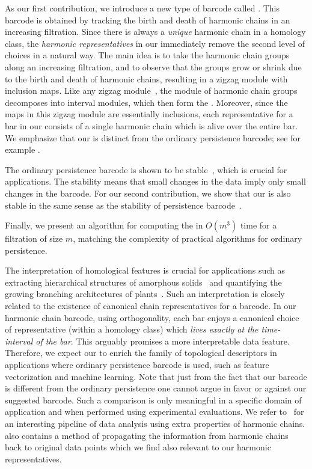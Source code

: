 As our first contribution, we introduce a new type of barcode called  \emph{\hcb}. This barcode is obtained by tracking the birth and death of harmonic chains in an increasing filtration.  
Since there is always a \emph{unique} harmonic chain in a homology class, the \emph{harmonic representatives} in our {\hcb} immediately remove the second level of choices in a natural way. The main idea is to take the harmonic chain groups along an increasing filtration, and to observe that the groups grow or shrink due to the birth and death of harmonic chains, resulting in a zigzag module with inclusion maps. 
Like any zigzag module~\cite{CarlssonSilva2010}, the module of harmonic chain groups decomposes into interval modules, which then form the {\hcd}.
Moreover, since the maps in this zigzag module are essentially inclusions,
each representative for a bar in our {\hcb} consists of a single harmonic chain which is alive over the entire bar. We emphasize that our {\hcb} is distinct from the ordinary persistence barcode; see for example . 

The ordinary persistence barcode is shown to be stable~\cite{Cohen-SteinerEdelsbrunnerHarer2005}, which is crucial for applications. The stability means that small changes in the data imply only small changes in the barcode. For our second contribution, we show that our {\hcb} is also stable in the same sense as the stability of persistence barcode~\cite{Cohen-SteinerEdelsbrunnerHarer2005}. 

Finally, we present an algorithm for computing 
the {\hcb} in $O(m^3)$ time for a filtration of size $m$,
matching the complexity of practical algorithms for ordinary persistence.

The interpretation of homological features is crucial for applications such as extracting hierarchical structures of amorphous solids~\cite{hiraoka2016hierarchical} and quantifying the growing branching architectures of plants~\cite{LiDuncanTopp2017}.
Such an interpretation is closely related to the existence of canonical chain representatives for a barcode. 
In our harmonic chain barcode, using orthogonality, each bar enjoys a canonical choice of representative (within a homology class) which \emph{lives exactly at the time-interval of the bar}. This arguably promises a more interpretable data feature. Therefore, we expect our {\hcbs} to enrich the family of topological descriptors in applications where ordinary persistence barcode is used, such as feature vectorization and machine learning. Note that just from the fact that our barcode is different from the ordinary persistence one cannot argue in favor or against our suggested barcode. Such a comparison is only meaningful in a specific domain of application and when performed using experimental evaluations. We refer to~\cite{GurnariGuzman-SaenzUtro2023} for an interesting pipeline of data analysis using extra properties of harmonic chains. \cite{GurnariGuzman-SaenzUtro2023} also contains a method of propagating the information from harmonic chains back to original data points which we find also relevant to our harmonic representatives.


